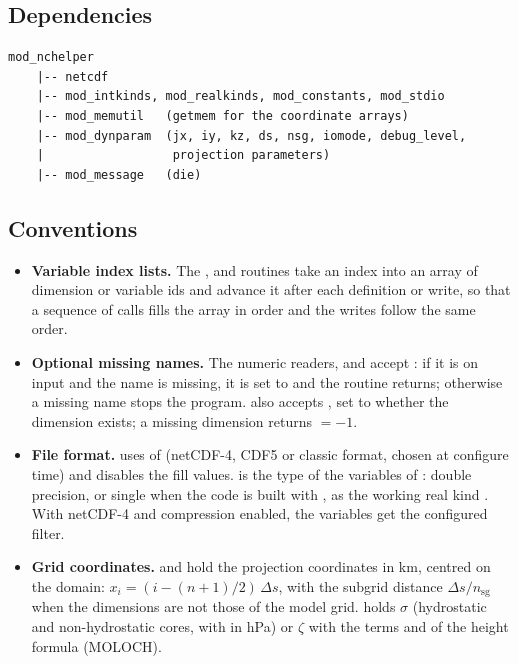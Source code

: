 \subsection{Dependencies}

\begin{lstlisting}
mod_nchelper
    |-- netcdf
    |-- mod_intkinds, mod_realkinds, mod_constants, mod_stdio
    |-- mod_memutil   (getmem for the coordinate arrays)
    |-- mod_dynparam  (jx, iy, kz, ds, nsg, iomode, debug_level,
    |                  projection parameters)
    |-- mod_message   (die)
\end{lstlisting}

\subsection{Conventions}

\begin{itemize}
  \item \textbf{Variable index lists.} The ,  and
         routines take an index  into an array
        of dimension or variable ids and advance it after each definition
        or write, so that a sequence of calls fills the array in order and
        the writes follow the same order.
  \item \textbf{Optional missing names.} The numeric readers,
         and
         accept : if it is  on
        input and the name is missing, it is set to  and the
        routine returns; otherwise a missing name stops the program.
         also accepts , set to whether the
        dimension exists; a missing dimension returns  $= -1$.
  \item \textbf{File format.}  uses
         of  (netCDF-4, CDF5 or classic
        format, chosen at configure time) and disables the fill values.
         is the type of the variables of
        : double precision, or single when the code is
        built with , as the working real kind
        . With netCDF-4 and
        compression enabled, the variables get the configured filter.
  \item \textbf{Grid coordinates.}  and  hold the
        projection coordinates in km, centred on the domain:
        $x_i = (i - (n+1)/2)\,\Delta s$, with the subgrid distance
        $\Delta s/n_\text{sg}$ when the dimensions are not those of the
        model grid.  holds $\sigma$ (hydrostatic and
        non-hydrostatic cores, with  in hPa) or $\zeta$ with the
        terms  and  of the height formula (MOLOCH).
\end{itemize}

